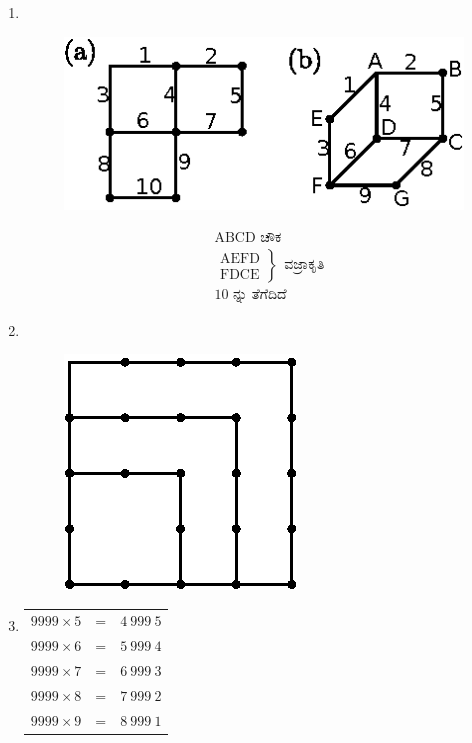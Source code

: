 \begin{enumerate}
\item
~

\begin{minipage}[c]{4cm}
\begin{figure}[H]
\centering
\includegraphics[scale=1.2]{images/chap5/ans11.eps}
\end{figure}
\end{minipage}
\qquad\qquad
\begin{minipage}[c]{4cm}
\begin{align*}
& \text{ABCD  ಚೌಕ }\\
& \left.
\begin{aligned}
\text{AEFD} \\
\text{FDCE}
\end{aligned}
\right\}
~~  \text{ವಜ್ರಾಕೃತಿ}\\
& 10 \text{ ನ್ನು ತೆಗೆದಿದೆ }
\end{align*}
\end{minipage}

\eject

\item
~
\vskip -0.8cm
\begin{figure}[H]
\centering
\includegraphics{images/chap5/ans12.eps}
\end{figure}

\item
\begin{tabular}[t]{lll}
$9999 \times 5$ & = & $4~999~5$\\
$9999 \times 6$ & = & $5~999~4$\\
$9999 \times 7$ & = & $6~999~3$\\
$9999 \times 8$ & = & $7~999~2$\\
$9999 \times 9$ & = & $8~999~1$
\end{tabular}


\end{enumerate}
